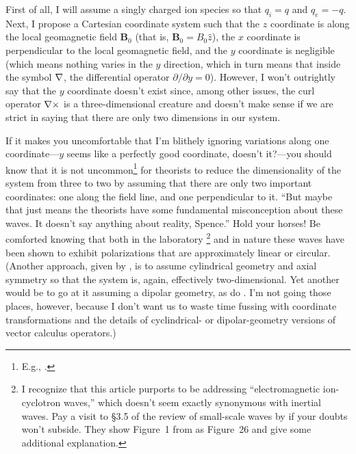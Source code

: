 First of all, I will assume a singly charged ion species so that $q_i = q$ and
$q_e = -q$. Next, I propose a Cartesian coordinate system such that the $z$
coordinate is along the local geomagnetic field $\mathbf{B}_0$ (that is,
$\mathbf{B}_0 = B_0 \hat{z}$), the $x$ coordinate is perpendicular to the local
geomagnetic field, and the $y$ coordinate is negligible (which means nothing
varies in the $y$ direction, which in turn means that inside the symbol ${\bf \nabla}$,
the differential operator $\partial / \partial y = 0$). However, I won't
outrightly say that the $y$ coordinate doesn't exist since, among other issues,
the curl operator ${\bf \nabla} \times$ is a three-dimensional creature and doesn't
make sense if we are strict in saying that there are only two dimensions in our
system.

If it makes you uncomfortable that I'm blithely ignoring variations along one
coordinate---$y$ seems like a perfectly good coordinate, doesn't it?---you
should know that it is not uncommon\footnote{E.g.,
  \citet{Hasegawa1976,Chmyrev1988,Streltsov1995,Bellan1996}.} for theorists to
reduce the dimensionality of the system from three to two by assuming that there
are only two important coordinates: one along the field line, and one
perpendicular to it. ``But maybe that just means the theorists have some
fundamental misconception about these waves. It doesn't say anything about
reality, Spence.'' Hold your horses! Be comforted knowing that both in the
laboratory \citep[Figure 1 in][]{Vincena1999}\footnote{I recognize that this
  article purports to be addressing ``electromagnetic ion-cyclotron waves,''
  which doesn't seem exactly synonymous with inertial \Alf waves. Pay a visit to
  \S3.5 of the review of small-scale \Alf waves by \citet{Stasiewicz2000} if
  your doubts won't subside. They show Figure~1 from \citet{Vincena1999} as
  Figure~26 and give some additional explanation.} and in nature
\citep{Stasiewicz2000} these waves have been shown to exhibit polarizations that
are approximately linear or circular. (Another approach, given by
\citet{Morales1994}, is to assume cylindrical geometry and axial symmetry so
that the system is, again, effectively two-dimensional. Yet another would be to
go at it assuming a dipolar geometry, as do \citet{Lysak2013}. I'm not going
those places, however, because I don't want us to waste time fussing with
coordinate transformations and the details of cyclindrical- or dipolar-geometry
versions of vector calculus operators.)

